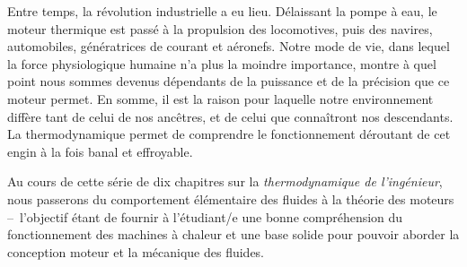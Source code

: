 Entre temps, la révolution industrielle a eu lieu. Délaissant la pompe à eau, le moteur thermique est passé à la propulsion des locomotives, puis des navires, automobiles, génératrices de courant et aéronefs. Notre mode de vie, dans lequel la force physiologique humaine n’a plus la moin\-dre importance, montre à quel point  nous som\-mes devenus dépendants de la puissance et de la précision que ce moteur permet. En somme, il est la raison pour laquelle notre environnement diffère tant de celui de nos ancêtres, et de celui que connaîtront nos descendants. La thermodynamique permet de comprendre le fonctionnement déroutant de cet engin à la fois banal et effroyable.

Au cours de cette série de dix chapitres sur la \textit{thermodynamique de l’ingénieur}, nous passerons du comportement élémentaire des fluides à la théorie des moteurs –\ l’objectif étant de fournir à l’étudiant/e une bonne compréhension du fonctionnement des machines à chaleur et une base solide pour pouvoir aborder la conception moteur et la mécanique des fluides.

